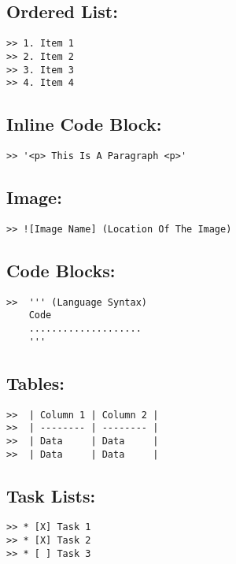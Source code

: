\documentclass[british]{article}
\begin{document}
\subsection{Ordered List:}
\begin{verbatim}
>> 1. Item 1
>> 2. Item 2
>> 3. Item 3
>> 4. Item 4
\end{verbatim}

\subsection{Inline Code Block:}
\begin{verbatim}
>> '<p> This Is A Paragraph <p>'
\end{verbatim}

\subsection{Image:}
\begin{verbatim}
>> ![Image Name] (Location Of The Image)
\end{verbatim}

\subsection{Code Blocks:}
\begin{verbatim}
>>  ''' (Language Syntax)
	Code 
	....................
	'''
\end{verbatim}

\subsection{Tables:}
\begin{verbatim}
>>  | Column 1 | Column 2 |
>>  | -------- | -------- |
>>  | Data     | Data     |
>>  | Data     | Data     |
\end{verbatim}

\subsection{Task Lists:}
\begin{verbatim}
>> * [X] Task 1
>> * [X] Task 2
>> * [ ] Task 3
\end{verbatim}
\end{document}
